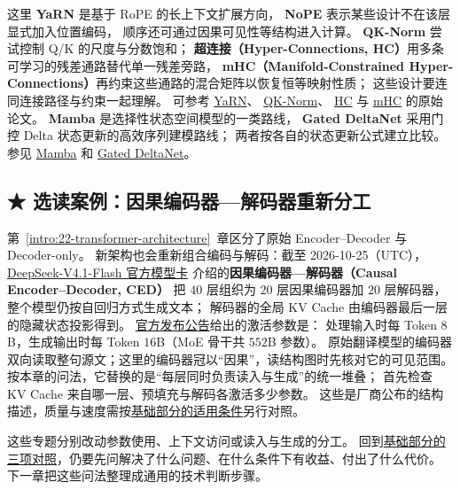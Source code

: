 \label{concept:yarn}这里 \textbf{YaRN} 是基于 RoPE 的长上下文扩展方向，
\textbf{NoPE} 表示某些设计不在该层显式加入位置编码，
顺序还可通过因果可见性等结构进入计算。
\label{concept:qk-norm}\textbf{QK-Norm} 尝试控制 Q/K 的尺度与分数饱和；
\textbf{超连接（Hyper-Connections, HC）}用多条可学习的残差通路替代单一残差旁路，
\textbf{mHC（Manifold-Constrained Hyper-Connections）}再约束这些通路的混合矩阵以恢复恒等映射性质；
这些设计要连同连接路径与约束一起理解。
可参考
\href{https://arxiv.org/abs/2309.00071}{YaRN}、
\href{https://aclanthology.org/2020.findings-emnlp.379/}{QK-Norm}、
\href{https://arxiv.org/abs/2409.19606}{HC}
与 \href{https://arxiv.org/abs/2512.24880}{mHC} 的原始论文。
\label{concept:mamba}\textbf{Mamba} 是选择性状态空间模型的一类路线，
\textbf{Gated DeltaNet} 采用门控 Delta 状态更新的高效序列建模路线；
两者按各自的状态更新公式建立比较。
参见 \href{https://arxiv.org/abs/2312.00752}{Mamba} 和
\href{https://arxiv.org/abs/2412.06464}{Gated DeltaNet}。

\subsection{\texorpdfstring{{\symboliconfont ★}}{★} 选读案例：因果编码器—解码器重新分工}
\label{elective:causal-encoder-decoder}

第~\ref*{intro:22-transformer-architecture}~章区分了原始 Encoder--Decoder 与 Decoder-only。
新架构也会重新组合编码与解码：截至 2026-10-25（UTC），
\href{https://huggingface.co/deepseek-ai/DeepSeek-V4.1-Flash}{DeepSeek-V4.1-Flash 官方模型卡}
介绍的\textbf{因果编码器—解码器（Causal Encoder--Decoder, CED）}
把 $40$ 层组织为 $20$ 层因果编码器加 $20$ 层解码器，整个模型仍按自回归方式生成文本；
解码器的全局 KV Cache 由编码器最后一层的隐藏状态投影得到。
\href{https://www.deepseek.com/en/news/deepseek-v4-1-flash/}{官方发布公告}给出的激活参数是：
处理输入时每 Token $8$B，生成输出时每 Token $16$B（MoE 骨干共 $552$B 参数）。
原始翻译模型的编码器双向读取整句源文；这里的编码器冠以“因果”，读结构图时先核对它的可见范围。
按本章的问法，它替换的是“每层同时负责读入与生成”的统一堆叠；
首先检查 KV Cache 来自哪一层、预填充与解码各激活多少参数。
这些是厂商公布的结构描述，质量与速度需按\hyperref[sec:modern-core-comparison]{基础部分的适用条件}另行对照。

\par\smallskip
这些专题分别改动参数使用、上下文访问或读入与生成的分工。
回到\hyperref[sec:modern-core-comparison]{基础部分的三项对照}，仍要先问解决了什么问题、在什么条件下有收益、付出了什么代价。
下一章把这些问法整理成通用的技术判断步骤。
